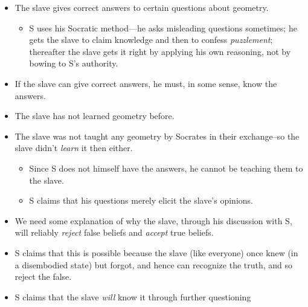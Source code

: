 \documentclass[10 pt]{article}
\begin{document}
\begin{itemize}
\item The slave gives correct answers to certain questions about geometry.
\begin{itemize}
\item S uses his Socratic method---he asks misleading questions sometimes; he gets the slave to claim knowledge and then to confess \emph{puzzlement}; thereafter the slave gets it right by applying his own reasoning, not by bowing to S's authority.
\end{itemize}
\item If the slave can give correct answers, he must, in some sense, know the answers. 
\item The slave has not learned geometry before. 
\item The slave was not taught any geometry by Socrates in their exchange--so the slave didn't \emph{learn} it then either.
\begin{itemize}
\item Since S does not himself have the answers, he cannot be teaching them to the slave. 
\item S claims that his questions merely elicit the slave's opinions. 
\end{itemize}
\item We need some explanation of why the slave, through his discussion with S, will reliably \emph{reject} false beliefs and \emph{accept} true beliefs. 
\item S claims that this is possible because the slave (like everyone) once knew (in a disembodied state) but forgot, and hence can recognize the truth, and so reject the false.
\item S claims that the slave \emph{will} know it through further questioning
\end{itemize}
 

\end{document}
